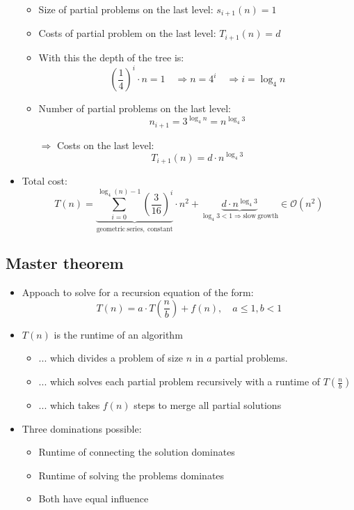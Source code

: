 \documentclass[12pt, a4paper]{scrartcl}
\newcommand{\bigO}{\mathcal{O}}
\renewcommand{\implies}{\Rightarrow}
\begin{document}
\begin{itemize}
  \begin{itemize}
  \item Size of partial problems on the last level: $s_{i+1}(n)=1$
  \item Costs of partial problem on the last level: $T_{i+1}(n)=d$
  \item With this the depth of the tree is:
    \begin{equation*}
      \left( \frac{1}{4} \right)^i\cdot n=1\quad\implies n=4^i\quad\implies i=\log_4 n
    \end{equation*}
  \item Number of partial problems on the last level:
    \begin{equation*}
      n_{i+1}=3^{\log_4 n}=n^{\log_4 3}
    \end{equation*}
  \item[$\implies$] Costs on the last level:
    \begin{equation*}
      T_{i+1}(n)=d\cdot n^{\log_4 3}
    \end{equation*}
  \end{itemize}
\item Total cost:
  \begin{equation*}
    T(n)=\underbrace{\sum^{\log_4(n)-1}_{i=0}\left( \frac{3}{16} \right)^i}_{\mathrm{geometric\ series,\ constant}}\cdot n^2 +
    \underbrace{d\cdot n^{\log_4 3}}_{\log_4 3<1\implies\mathrm{slow\ growth}}\in\bigO(n^2)
  \end{equation*}
\end{itemize}

\subsection{Master theorem}
\label{sec:master_theorem}
\begin{itemize}
\item Appoach to solve for a recursion equation of the form:
  \begin{equation}
    \label{eq:master_theorem_basic}
    \boxed{T(n)=a\cdot T\left( \frac{n}{b} \right)+f(n),\quad a\le 1, b< 1}
  \end{equation}
\item $T(n)$ is the runtime of an algorithm
  \begin{itemize}
  \item ... which divides a problem of size $n$ in $a$ partial problems.
  \item ... which solves each partial problem recursively with a runtime of $T\left( \frac{n}{b} \right)$
  \item ... which takes $f(n)$ steps to merge all partial solutions
  \end{itemize}
\item Three dominations possible:
  \begin{itemize}
  \item Runtime of connecting the solution dominates
  \item Runtime of solving the problems dominates
  \item Both have equal influence
  \end{itemize}
\end{itemize}
\end{document}
